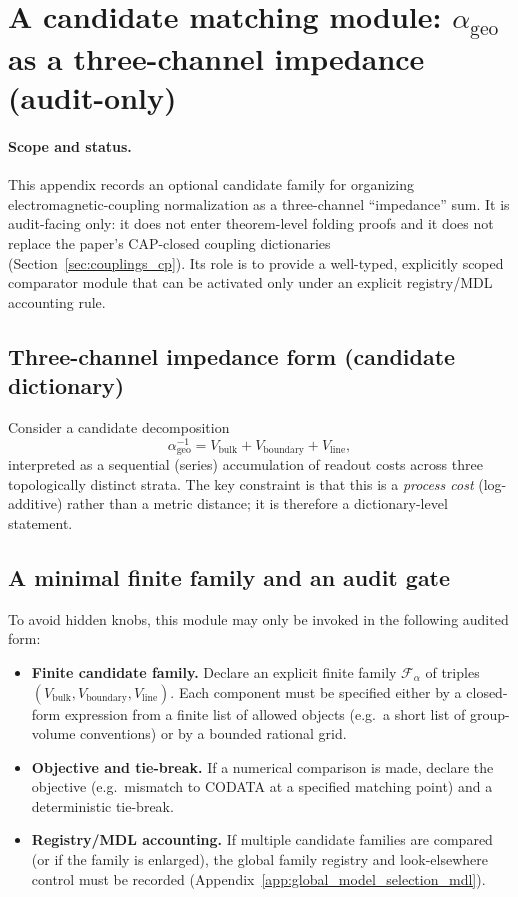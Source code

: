 \section{A candidate matching module: $\alpha_{\mathrm{geo}}$ as a three-channel impedance (audit-only)}
\label{app:alpha_geo_impedance_candidate}

\paragraph{Scope and status.}
\AuditTag This appendix records an optional candidate family for organizing electromagnetic-coupling normalization as a three-channel ``impedance'' sum.
It is audit-facing only: it does not enter theorem-level folding proofs and it does not replace the paper's CAP-closed coupling dictionaries (Section~\ref{sec:couplings_cp}).
Its role is to provide a well-typed, explicitly scoped comparator module that can be activated only under an explicit registry/MDL accounting rule.

\subsection{Three-channel impedance form (candidate dictionary)}
\label{subsec:alpha_geo_impedance_form}

\InterfaceTag Consider a candidate decomposition
\[
\alpha_{\mathrm{geo}}^{-1}=V_{\mathrm{bulk}}+V_{\mathrm{boundary}}+V_{\mathrm{line}},
\]
interpreted as a sequential (series) accumulation of readout costs across three topologically distinct strata.
The key constraint is that this is a \emph{process cost} (log-additive) rather than a metric distance; it is therefore a dictionary-level statement.

\subsection{A minimal finite family and an audit gate}
\label{subsec:alpha_geo_impedance_audit_gate}

\AuditTag To avoid hidden knobs, this module may only be invoked in the following audited form:
\begin{itemize}
\item \textbf{Finite candidate family.} Declare an explicit finite family $\mathcal{F}_\alpha$ of triples $(V_{\mathrm{bulk}},V_{\mathrm{boundary}},V_{\mathrm{line}})$.
Each component must be specified either by a closed-form expression from a finite list of allowed objects (e.g.\ a short list of group-volume conventions) or by a bounded rational grid.
\item \textbf{Objective and tie-break.} If a numerical comparison is made, declare the objective (e.g.\ mismatch to CODATA at a specified matching point) and a deterministic tie-break.
\item \textbf{Registry/MDL accounting.} If multiple candidate families are compared (or if the family is enlarged), the global family registry and look-elsewhere control must be recorded (Appendix~\ref{app:global_model_selection_mdl}).
\end{itemize}

